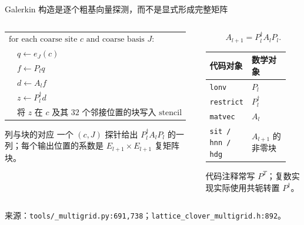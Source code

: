 \documentclass[UTF8,aspectratio=169,11pt]{ctexbeamer}
\newcommand{\source}[1]{%
  \vspace{-0.08em}\par{\raggedright\scriptsize\color{muted}来源：#1\par}}
\newcommand{\src}[1]{\nolinkurl{#1}}
\begin{document}
\begin{frame}[t]{Galerkin 构造是逐个粗基向量探测，而不是显式形成完整矩阵}
  \begin{columns}[T,totalwidth=\textwidth]
    \begin{column}{0.54\textwidth}
      \begin{tabular}{@{}l@{}}
        $\text{for each coarse site }c\text{ and coarse basis }J:$ \\
        $\quad q\leftarrow e_J(c)$ \\
        $\quad f\leftarrow P_lq$ \\
        $\quad d\leftarrow A_lf$ \\
        $\quad z\leftarrow P_l^\dagger d$ \\
        $\quad \text{将 }z\text{ 在 }c\text{ 及其 32 个邻接位置的块写入 stencil}$
      \end{tabular}
      \vspace{0.4em}
      \begin{block}{列与块的对应}
        \footnotesize
        一个 $(c,J)$ 探针给出 $P_l^\dagger A_lP_l$ 的一列；每个输出位置的系数是
        $E_{l+1}\times E_{l+1}$ 复矩阵块。
      \end{block}
    \end{column}
    \begin{column}{0.40\textwidth}
      \begin{equation*}
        A_{l+1}=P_l^\dagger A_lP_l.
      \end{equation*}
      \begin{tabular}{@{}P{0.36\linewidth}P{0.48\linewidth}@{}}
        \toprule
        代码对象 & 数学对象 \\
        \midrule
        \src{lonv} & $P_l$ \\
        \src{restrict} & $P_l^\dagger$ \\
        \src{matvec} & $A_l$ \\
        \src{sit / hnn / hdg} & $A_{l+1}$ 的非零块 \\
        \bottomrule
      \end{tabular}
      \par\vspace{0.18em}
      \noindent\textcolor{accent}{代码注释常写 $P^T$；复数实现实际使用共轭转置 $P^\dagger$。}
    \end{column}
  \end{columns}
  \source{\src{tools/_multigrid.py:691,738}；\src{lattice_clover_multigrid.h:892}。}
\end{frame}
\end{document}
